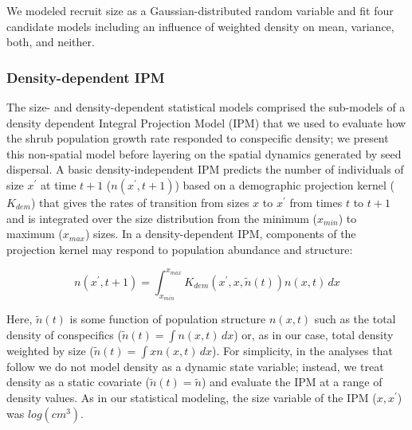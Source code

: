 \documentclass[11pt]{article}\usepackage[]{graphicx}\usepackage[usenames,dvipsnames]{xcolor}
\begin{document}
We modeled recruit size as a Gaussian-distributed random variable and fit four candidate models including an influence of weighted density on mean, variance, both, and neither. 

\subsubsection*{Density-dependent IPM}
The size- and density-dependent statistical models comprised the sub-models of a density dependent Integral Projection Model (IPM) that we used to evaluate how the shrub population growth rate responded to conspecific density; we present this non-spatial model before layering on the spatial dynamics generated by seed dispersal. 
A basic density-independent IPM predicts the number of individuals of size $x^\prime$ at time $t+1$ ($n(x^\prime,t + 1)$) based on a demographic projection kernel ($K_{dem}$) that gives the rates of transition from sizes $x$ to $x^\prime$ from times $t$ to $t+1$ and is integrated over the size distribution from the minimum ($x_{min}$) to maximum ($x_{max}$) sizes. In a density-dependent IPM, components of the projection kernel may respond to population abundance and structure:
\begin{linenomath*} 
\begin{equation} \label{eq:DDIPM}
n(x^\prime,t + 1) = \int_{x_{min}}^{x_{max}} K_{dem}(x^\prime,x,\tilde{n}(t)) n(x,t) \,dx 
\end{equation} 
\end{linenomath*}
Here, $\tilde{n}(t)$ is some function of population structure $n(x,t)$ such as the total density of conspecifics ($\tilde{n}(t)=\int n(x,t) \,dx$) or, as in our case, total density weighted by size ($\tilde{n}(t)=\int x n(x,t) \,dx$). 
For simplicity, in the analyses that follow we do not model density as a dynamic state variable; instead, we treat density as a static covariate ($\tilde{n}(t)=\tilde{n}$) and evaluate the IPM at a range of density values. 
As in our statistical modeling, the size variable of the IPM ($x,x^\prime$) was $log(cm^3)$.
\end{document}
